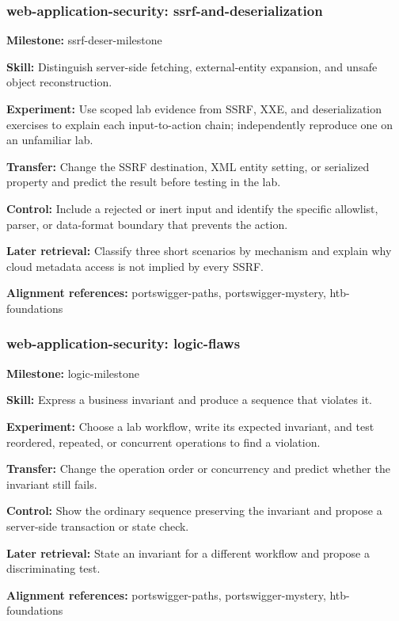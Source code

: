 \subsubsection{web-application-security: ssrf-and-deserialization}
\noindent\textbf{Milestone:} ssrf-deser-milestone\par
\noindent\textbf{Skill:} Distinguish server-side fetching, external-entity expansion, and unsafe object reconstruction.\par
\noindent\textbf{Experiment:} Use scoped lab evidence from SSRF, XXE, and deserialization exercises to explain each input-to-action chain; independently reproduce one on an unfamiliar lab.\par
\noindent\textbf{Transfer:} Change the SSRF destination, XML entity setting, or serialized property and predict the result before testing in the lab.\par
\noindent\textbf{Control:} Include a rejected or inert input and identify the specific allowlist, parser, or data-format boundary that prevents the action.\par
\noindent\textbf{Later retrieval:} Classify three short scenarios by mechanism and explain why cloud metadata access is not implied by every SSRF.\par
\noindent\textbf{Alignment references:} portswigger-paths, portswigger-mystery, htb-foundations\par
\subsubsection{web-application-security: logic-flaws}
\noindent\textbf{Milestone:} logic-milestone\par
\noindent\textbf{Skill:} Express a business invariant and produce a sequence that violates it.\par
\noindent\textbf{Experiment:} Choose a lab workflow, write its expected invariant, and test reordered, repeated, or concurrent operations to find a violation.\par
\noindent\textbf{Transfer:} Change the operation order or concurrency and predict whether the invariant still fails.\par
\noindent\textbf{Control:} Show the ordinary sequence preserving the invariant and propose a server-side transaction or state check.\par
\noindent\textbf{Later retrieval:} State an invariant for a different workflow and propose a discriminating test.\par
\noindent\textbf{Alignment references:} portswigger-paths, portswigger-mystery, htb-foundations\par
